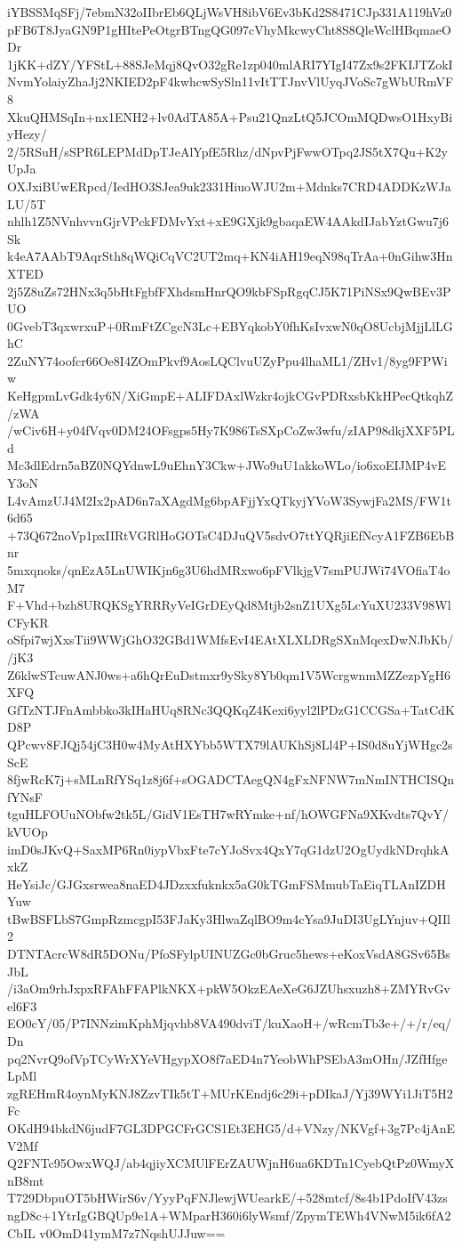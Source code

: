 iYBSSMqSFj/7ebmN32oIIbrEb6QLjWsVH8ibV6Ev3bKd2S8471CJp331A119hVz0
pFB6T8JyaGN9P1gHItePeOtgrBTngQG097cVhyMkcwyCht8S8QleWclHBqmaeODr
1jKK+dZY/YFStL+88SJeMqj8QvO32gRe1zp040mlARI7YIgI47Zx9s2FKIJTZokI
NvmYolaiyZhaJj2NKIED2pF4kwhcwSySln11vItTTJnvVlUyqJVoSc7gWbURmVF8
XkuQHMSqIn+nx1ENH2+lv0AdTA85A+Psu21QnzLtQ5JCOmMQDwsO1HxyBiyHezy/
2/5RSuH/sSPR6LEPMdDpTJeAlYpfE5Rhz/dNpvPjFwwOTpq2JS5tX7Qu+K2yUpJa
OXJxiBUwERpcd/IedHO3SJea9uk2331HiuoWJU2m+Mdnks7CRD4ADDKzWJaLU/5T
nhlh1Z5NVnhvvnGjrVPckFDMvYxt+xE9GXjk9gbaqaEW4AAkdIJabYztGwu7j6Sk
k4eA7AAbT9AqrSth8qWQiCqVC2UT2mq+KN4iAH19eqN98qTrAa+0nGihw3HnXTED
2j5Z8uZs72HNx3q5bHtFgbfFXhdsmHnrQO9kbFSpRgqCJ5K71PiNSx9QwBEv3PUO
0GvebT3qxwrxuP+0RmFtZCgcN3Lc+EBYqkobY0fhKsIvxwN0qO8UcbjMjjLlLGhC
2ZuNY74oofcr66Oe8I4ZOmPkvf9AosLQClvuUZyPpu4lhaML1/ZHv1/8yg9FPWiw
KeHgpmLvGdk4y6N/XiGmpE+ALIFDAxlWzkr4ojkCGvPDRxsbKkHPecQtkqhZ/zWA
/wCiv6H+y04fVqv0DM24OFsgps5Hy7K986TsSXpCoZw3wfu/zIAP98dkjXXF5PLd
Mc3dlEdrn5aBZ0NQYdnwL9uEhnY3Ckw+JWo9uU1akkoWLo/io6xoEIJMP4vEY3oN
L4vAmzUJ4M2Ix2pAD6n7aXAgdMg6bpAFjjYxQTkyjYVoW3SywjFa2MS/FW1t6d65
+73Q672noVp1pxIIRtVGRlHoGOTsC4DJuQV5sdvO7ttYQRjiEfNcyA1FZB6EbBnr
5mxqnoks/qnEzA5LnUWIKjn6g3U6hdMRxwo6pFVlkjgV7smPUJWi74VOfiaT4oM7
F+Vhd+bzh8URQKSgYRRRyVeIGrDEyQd8Mtjb2snZ1UXg5LcYuXU233V98WlCFyKR
oSfpi7wjXxsTii9WWjGhO32GBd1WMfsEvI4EAtXLXLDRgSXnMqexDwNJbKb//jK3
Z6klwSTcuwANJ0ws+a6hQrEuDstmxr9ySky8Yb0qm1V5WcrgwnmMZZezpYgH6XFQ
GfTzNTJFnAmbbko3kIHaHUq8RNc3QQKqZ4Kexi6yyl2lPDzG1CCGSa+TatCdKD8P
QPcwv8FJQj54jC3H0w4MyAtHXYbb5WTX79lAUKhSj8Ll4P+IS0d8uYjWHgc2sScE
8fjwRcK7j+sMLnRfYSq1z8j6f+sOGADCTAegQN4gFxNFNW7mNmINTHCISQnfYNsF
tguHLFOUuNObfw2tk5L/GidV1EsTH7wRYmke+nf/hOWGFNa9XKvdts7QvY/kVUOp
imD0sJKvQ+SaxMP6Rn0iypVbxFte7cYJoSvx4QxY7qG1dzU2OgUydkNDrqhkAxkZ
HeYsiJc/GJGxsrwea8naED4JDzxxfuknkx5aG0kTGmFSMmubTaEiqTLAnIZDHYuw
tBwBSFLbS7GmpRzmcgpI53FJaKy3HlwaZqlBO9m4cYsa9JuDI3UgLYnjuv+QIIl2
DTNTAcrcW8dR5DONu/PfoSFylpUINUZGc0bGruc5hews+eKoxVsdA8GSv65BsJbL
/i3aOm9rhJxpxRFAhFFAPlkNKX+pkW5OkzEAeXeG6JZUhsxuzh8+ZMYRvGvel6F3
EO0cY/05/P7INNzimKphMjqvhb8VA490dviT/kuXaoH+/wRcmTb3e+/+/r/eq/Dn
pq2NvrQ9ofVpTCyWrXYeVHgypXO8f7aED4n7YeobWhPSEbA3mOHn/JZfHfgeLpMl
zgREHmR4oynMyKNJ8ZzvTIk5tT+MUrKEndj6c29i+pDIkaJ/Yj39WYi1JiT5H2Fc
OKdH94bkdN6judF7GL3DPGCFrGCS1Et3EHG5/d+VNzy/NKVgf+3g7Pc4jAnEV2Mf
Q2FNTc95OwxWQJ/ab4qjiyXCMUlFErZAUWjnH6ua6KDTn1CyebQtPz0WmyXnB8mt
T729DbpuOT5bHWirS6v/YyyPqFNJlewjWUearkE/+528mtcf/8s4b1PdoIfV43zs
ngD8c+1YtrIgGBQUp9e1A+WMparH360i6lyWsmf/ZpymTEWh4VNwM5ik6fA2CbIL
v0OmD41ymM7z7NqshUJJuw==
